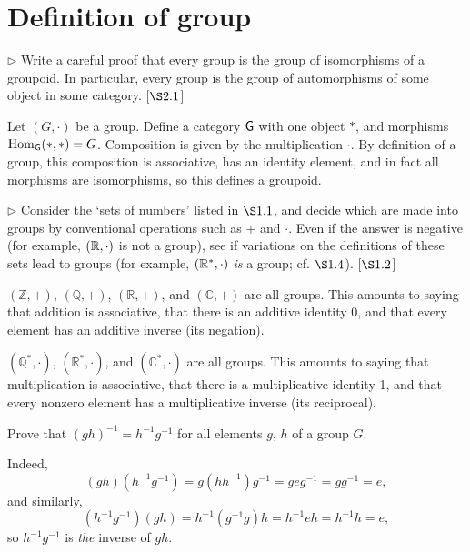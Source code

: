 \section{Definition of group}
\extitle
\begin{exercise}
	$\triangleright$ Write a careful proof that every group is the group of isomorphisms of a groupoid. In particular, every group is the group of automorphisms of some object in some category. [$\S 2.1$]
\end{exercise}
\begin{solution}
	Let $(G,\cdot)$ be a group. Define a category $\textsf{G}$ with one object $\ast$, and morphisms $\operatorname{Hom}_{\textsf{G}}(\ast,\ast) = G$. Composition is given by the multiplication $\cdot$. By definition of a group, this composition is associative, has an identity element, and in fact all morphisms are isomorphisms, so this defines a groupoid.
\end{solution}

\begin{exercise}
	$\triangleright$ Consider the `sets of numbers' listed in $\S 1.1$, and decide which are made into groups by conventional operations such as $+$ and $\cdot$. Even if the answer is negative (for example, $(\mathbb{R}, \cdot)$ is not a group), see if variations on the definitions of these sets lead to groups (for example, $(\mathbb{R}^{*}, \cdot)$ \emph{is} a group; cf. $\S 1.4$). [$\S 1.2$] 
\end{exercise}
\begin{solution}
	$(\mathbb{Z},+)$, $(\mathbb{Q}, +)$, $(\mathbb{R}, +)$, and $(\mathbb{C},+)$ are all groups. This amounts to saying that addition is associative, that there is an additive identity 0, and that every element has an additive inverse (its negation). 
	
	$(\mathbb{Q}^*, \cdot)$, $(\mathbb{R}^*, \cdot)$, and $(\mathbb{C}^*,\cdot)$ are all groups. This amounts to saying that multiplication is associative, that there is a multiplicative identity 1, and that every nonzero element has a multiplicative inverse (its reciprocal).
\end{solution}

\begin{exercise}
	Prove that $(gh)^{-1} = h^{-1}g^{-1}$ for all elements $g$, $h$ of a group $G$.
\end{exercise}
\begin{solution}
	Indeed, 
	\begin{equation*}
		(gh)(h^{-1}g^{-1}) = g(hh^{-1})g^{-1} = geg^{-1} = gg^{-1} = e,
	\end{equation*}
	and similarly,
	\begin{equation*}
		(h^{-1}g^{-1})(gh) = h^{-1}(g^{-1}g)h = h^{-1}eh = h^{-1}h = e,
	\end{equation*}
	so $h^{-1}g^{-1} $ is \emph{the} inverse of $gh$.
\end{solution}

